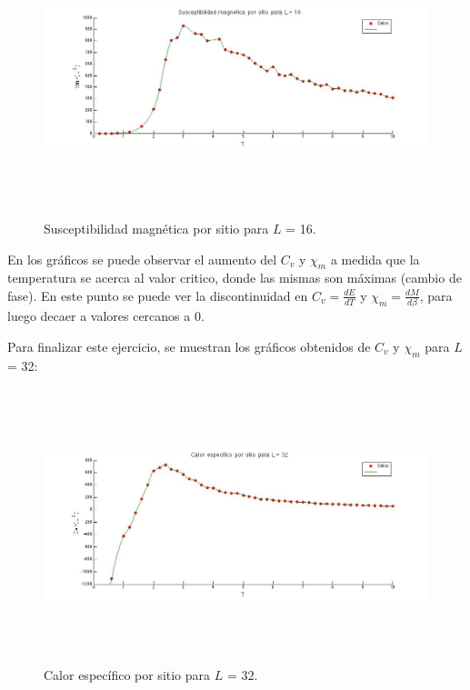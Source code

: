\documentclass[a4paper,12pt]{article}
\begin{document}
\begin{figure}[H]
\begin{center}
\includegraphics[height=8cm]{../graficos/Xm_L16.jpg}
\caption[width=5cm]{Susceptibilidad magn\'etica por sitio para $L$ = 16.}
\end{center}
\end{figure}

En los gr\'aficos se puede observar el aumento del $C_{v}$ y $\chi_{m}$ a medida que la temperatura se acerca al valor critico, donde las mismas son m\'aximas (cambio de fase). En este punto se puede ver la discontinuidad en $C_{v} = \frac{dE}{dT}$ y $\chi_{m} = \frac{dM}{d\beta}$, para luego decaer a valores cercanos a 0.

Para finalizar este ejercicio, se muestran los gr\'aficos obtenidos de $C_{v}$ y $\chi_{m}$ para $L$ = 32:

\begin{figure}[H]
\begin{center}
\includegraphics[height=8cm]{../graficos/Cv_L32.jpg}
\caption[width=5cm]{Calor espec\'ifico por sitio para $L$ = 32.}
\end{center}
\end{figure}
\end{document}
